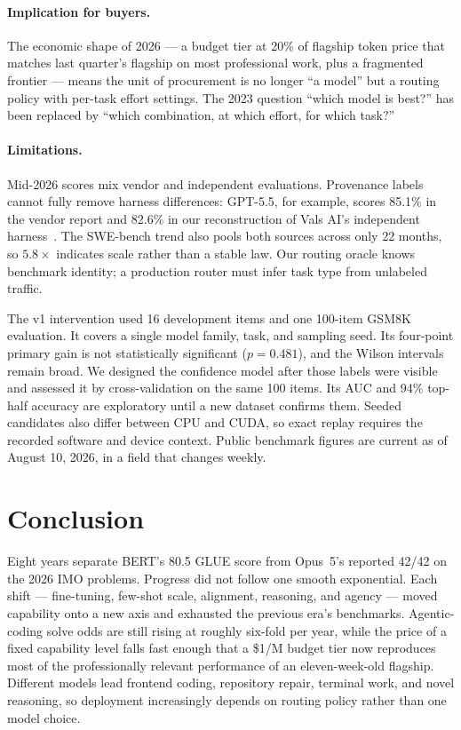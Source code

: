 \documentclass[11pt]{article}
\begin{document}
\paragraph{Implication for buyers.} The economic shape of 2026 --- a budget
tier at 20\% of flagship token price that matches last quarter's flagship on most
professional work, plus a fragmented frontier --- means the unit of procurement
is no longer ``a model'' but a routing policy with per-task effort settings.
The 2023 question ``which model is best?'' has been replaced by ``which
combination, at which effort, for which task?''

\paragraph{Limitations.} Mid-2026 scores mix vendor and independent
evaluations. Provenance labels cannot fully remove harness differences:
GPT-5.5, for example, scores 85.1\% in the vendor report and 82.6\% in our
reconstruction of Vals AI's independent
harness~\cite{localaimaster2026gpt55,vals2026swebench}. The SWE-bench trend
also pools both sources across only 22 months, so $5.8\times$ indicates scale
rather than a stable law. Our routing oracle knows benchmark identity; a
production router must infer task type from unlabeled traffic.

The v1 intervention used 16 development items and one 100-item GSM8K
evaluation. It covers a single model family, task, and sampling seed. Its
four-point primary gain is not statistically significant ($p=0.481$), and the
Wilson intervals remain broad. We designed the confidence model after those
labels were visible and assessed it by cross-validation on the same 100 items.
Its AUC and 94\% top-half accuracy are exploratory until a new dataset confirms
them. Seeded candidates also differ between CPU and CUDA, so exact replay
requires the recorded software and device context. Public benchmark figures
are current as of August 10, 2026, in a field that changes weekly.

\section{Conclusion}\label{sec:conclusion}

Eight years separate BERT's 80.5 GLUE score from Opus~5's reported 42/42 on
the 2026 IMO problems. Progress did not follow one smooth exponential. Each
shift --- fine-tuning, few-shot scale, alignment, reasoning, and agency ---
moved capability onto a new axis and exhausted the previous era's benchmarks.
Agentic-coding solve odds are still rising at roughly six-fold per year, while
the price of a fixed capability level falls fast enough that a \$1/M budget
tier now reproduces most of the professionally relevant performance of an
eleven-week-old flagship. Different models lead frontend coding, repository
repair, terminal work, and novel reasoning, so deployment increasingly depends
on routing policy rather than one model choice.
\end{document}
